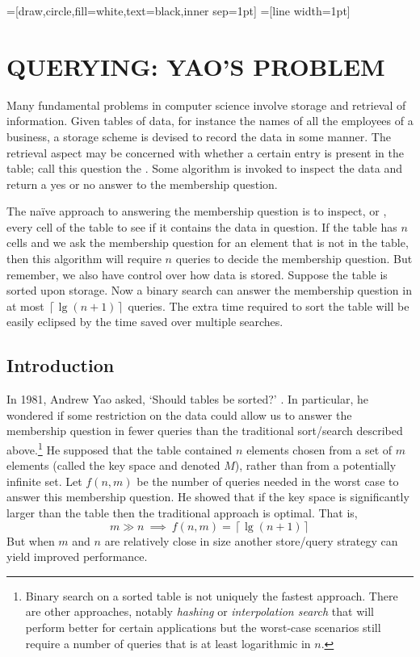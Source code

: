 \newcommand*{\key}[2]{\ensuremath{K_{#1}^{#2}}}%
=[draw,circle,fill=white,text=black,inner sep=1pt]%
=[line width=1pt]%
\chapter{QUERYING: YAO'S PROBLEM}

Many fundamental problems in computer science involve storage and retrieval of information. Given tables of data,  for instance the names of all the employees of a business, a storage scheme is devised to record the data in some manner. The retrieval aspect may be concerned with whether a certain entry is present in the table; call this question the . Some algorithm is invoked to inspect the data and return a yes or no answer to the membership question.

The na\"{i}ve approach to answering the membership question is to inspect, or , every cell of the table to see if it contains the data in question. If the table has $n$ cells and we ask the membership question for an element that is not in the table, then this algorithm will require $n$ queries to decide the membership question. But remember, we also have control over how data is stored. Suppose the table is sorted upon storage. Now a binary search can answer the membership question in at most $\left\lceil\lg\left(n+1\right)\right\rceil$ queries. The extra time required to sort the table will be easily eclipsed by the time saved over multiple searches.

\section{Introduction}

In 1981, Andrew Yao asked, `Should tables be sorted?' \cite{Yao}. In particular, he wondered if some restriction on the data could allow us to answer the membership question in fewer queries than the traditional sort/search described above.\footnote{Binary search on a sorted table is not uniquely the fastest approach. There are other approaches, notably \emph{hashing} or \emph{interpolation search} that will perform better for certain applications but the worst-case scenarios still require a number of queries that is at least logarithmic in $n$.} He supposed that the table contained $n$ elements chosen from a set of $m$ elements (called the key space and denoted $M$), rather than from a potentially infinite set. Let $f\left(n,m\right)$ be the number of queries needed in the worst case to answer this membership question. He showed that if the key space is significantly larger than the table then the traditional approach is optimal. That is, \[ m \gg n\ \implies\ f\left(n,m\right) = \left\lceil\lg\left(n+1\right)\right\rceil \] But when $m$ and $n$ are relatively close in size another store/query strategy can yield improved performance.

